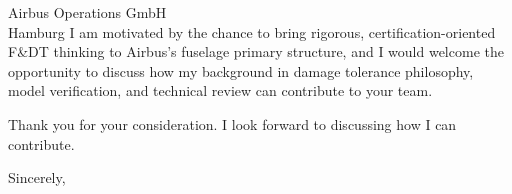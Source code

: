 \documentclass[10pt]{letter}
\begin{document}
\begin{letter}{Airbus Operations GmbH \\ Hamburg}
I am motivated by the chance to bring rigorous, certification-oriented F\&DT thinking to Airbus's fuselage primary structure, and I would welcome the opportunity to discuss how my background in damage tolerance philosophy, model verification, and technical review can contribute to your team.

Thank you for your consideration. I look forward to discussing how I can contribute.

\closing{Sincerely,}
\end{letter}
\end{document}
